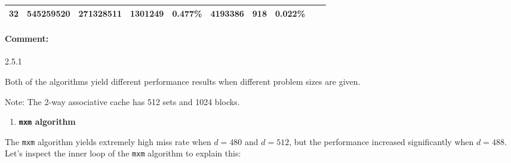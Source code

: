 \documentclass[11pt]{article}
\providecommand{\tightlist}{%
      \setlength{\itemsep}{0pt}\setlength{\parskip}{0pt}}
\begin{document}
\begin{longtable}[]{@{}llllllllll@{}}
\begin{minipage}[t]{0.09\columnwidth}
32\strut
\end{minipage} & \begin{minipage}[t]{0.07\columnwidth}\raggedright\strut
545259520\strut
\end{minipage} & \begin{minipage}[t]{0.06\columnwidth}\raggedright\strut
271328511\strut
\end{minipage} & \begin{minipage}[t]{0.07\columnwidth}\raggedright\strut
1301249\strut
\end{minipage} & \begin{minipage}[t]{0.07\columnwidth}\raggedright\strut
0.477\%\strut
\end{minipage} & \begin{minipage}[t]{0.06\columnwidth}\raggedright\strut
4193386\strut
\end{minipage} & \begin{minipage}[t]{0.07\columnwidth}\raggedright\strut
918\strut
\end{minipage} & \begin{minipage}[t]{0.07\columnwidth}\raggedright\strut
0.022\%\strut
\end{minipage}\tabularnewline
\bottomrule
\end{longtable}

    \paragraph{Comment:}\label{comment}

2.5.1

Both of the algorithms yield different performance results when
different problem sizes are given.

Note: The 2-way associative cache has 512 sets and 1024 blocks.

\begin{enumerate}
\def\labelenumi{(\roman{enumi})}
\tightlist
\item
  \textbf{\texttt{mxm} algorithm}
\end{enumerate}

The \texttt{mxm} algorithm yields extremely high miss rate when
\(d=480\) and \(d=512\), but the performance increased significantly
when \(d=488\). Let's inspect the inner loop of the \texttt{mxm}
algorithm to explain this:
\end{document}

